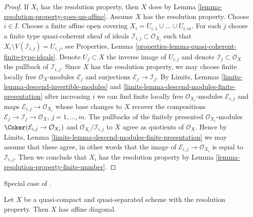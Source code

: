 \begin{proof}
If $X_i$ has the resolution property, then $X$ does by
Lemma \ref{lemma-resolution-property-goes-up-affine}.
Assume $X$ has the resolution property.
Choose $i \in I$. Choose a finite affine open covering
$X_i = U_{i, 1} \cup \ldots \cup U_{i, m}$.
For each $j$ choose a finite type quasi-coherent sheaf
of ideals $\mathcal{I}_{i, j} \subset \mathcal{O}_{X_i}$
such that $X_i \setminus V(\mathcal{I}_{i, j}) = U_{i, j}$, see
Properties, Lemma \ref{properties-lemma-quasi-coherent-finite-type-ideals}.
Denote $U_j \subset X$ the inverse image of $U_{i, j}$
and denote $\mathcal{I}_j \subset \mathcal{O}_X$
the pullback of $\mathcal{I}_{i, j}$.
Since $X$ has the resolution property, we may
choose finite locally free $\mathcal{O}_X$-modules $\mathcal{E}_j$
and surjections $\mathcal{E}_j \to \mathcal{I}_j$.
By Limits, Lemmas \ref{limits-lemma-descend-invertible-modules} and
\ref{limits-lemma-descend-modules-finite-presentation}
after increasing $i$ we can find finite locally free
$\mathcal{O}_{X_i}$-modules $\mathcal{E}_{i, j}$
and maps $\mathcal{E}_{i, j} \to \mathcal{O}_{X_i}$
whose base changes to $X$ recover the compositions
$\mathcal{E}_j \to \mathcal{I}_j \to \mathcal{O}_X$, $j = 1, \ldots, m$.
The pullbacks of the finitely presented $\mathcal{O}_{X_i}$-modules
$\Coker(\mathcal{E}_{i, j} \to \mathcal{O}_{X_i})$
and $\mathcal{O}_{X_i}/\mathcal{I}_{i, j}$
to $X$ agree as quotients of $\mathcal{O}_X$.
Hence by Limits, Lemma
\ref{limits-lemma-descend-modules-finite-presentation}
we may assume that these agree, in other words that
the image of $\mathcal{E}_{i, j} \to \mathcal{O}_{X_i}$
is equal to $\mathcal{I}_{i, j}$.
Then we conclude that $X_i$ has the resolution property
by Lemma \ref{lemma-resolution-property-finite-number}.
\end{proof}

\begin{lemma}
\label{lemma-resolution-property-affine-diagonal}
\begin{reference}
Special case of \cite[Proposition 1.3]{totaro_resolution}.
\end{reference}
Let $X$ be a quasi-compact and quasi-separated scheme with
the resolution property. Then $X$ has affine diagonal.
\end{lemma}

